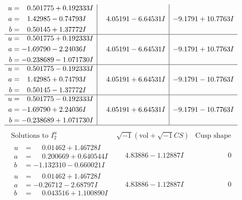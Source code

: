 \documentclass[1p]{elsarticle_modified}
\theoremstyle{definition}
\newcommand{\I}{\sqrt{-1}}
\begin{document}
$$\begin{array}{c|c|c}
\begin{aligned}
u &= \phantom{-}0.501775 + 0.192333 I \\
a &= \phantom{-}1.42985 - 0.74793 I \\
b &= \phantom{-}0.50145 + 1.37772 I\end{aligned}
 & \phantom{-}4.05191 - 6.64531 I & -9.1791 + 10.7763 I \\ \hline\begin{aligned}
u &= \phantom{-}0.501775 + 0.192333 I \\
a &= -1.69790 - 2.24036 I \\
b &= -0.238689 - 1.071730 I\end{aligned}
 & \phantom{-}4.05191 - 6.64531 I & -9.1791 + 10.7763 I \\ \hline\begin{aligned}
u &= \phantom{-}0.501775 - 0.192333 I \\
a &= \phantom{-}1.42985 + 0.74793 I \\
b &= \phantom{-}0.50145 - 1.37772 I\end{aligned}
 & \phantom{-}4.05191 + 6.64531 I & -9.1791 - 10.7763 I \\ \hline\begin{aligned}
u &= \phantom{-}0.501775 - 0.192333 I \\
a &= -1.69790 + 2.24036 I \\
b &= -0.238689 + 1.071730 I\end{aligned}
 & \phantom{-}4.05191 + 6.64531 I & -9.1791 - 10.7763 I\\
 \hline 
 \end{array}$$\newpage$$\begin{array}{c|c|c}  
\text{Solutions to }I^u_{2}& \I (\text{vol} + \sqrt{-1}CS) & \text{Cusp shape}\\
 \hline 
\begin{aligned}
u &= \phantom{-}0.01462 + 1.46728 I \\
a &= \phantom{-}0.200669 + 0.640544 I \\
b &= -1.132310 - 0.660021 I\end{aligned}
 & \phantom{-}4.83886 - 1.12887 I & \phantom{-0.000000 } 0 \\ \hline\begin{aligned}
u &= \phantom{-}0.01462 + 1.46728 I \\
a &= -0.26712 - 2.68797 I \\
b &= \phantom{-}0.043516 + 1.100890 I\end{aligned}
 & \phantom{-}4.83886 - 1.12887 I & \phantom{-0.000000 } 0 \\ \hline\begin{aligned}

\end{aligned}
\end{array}$$
\end{document}
